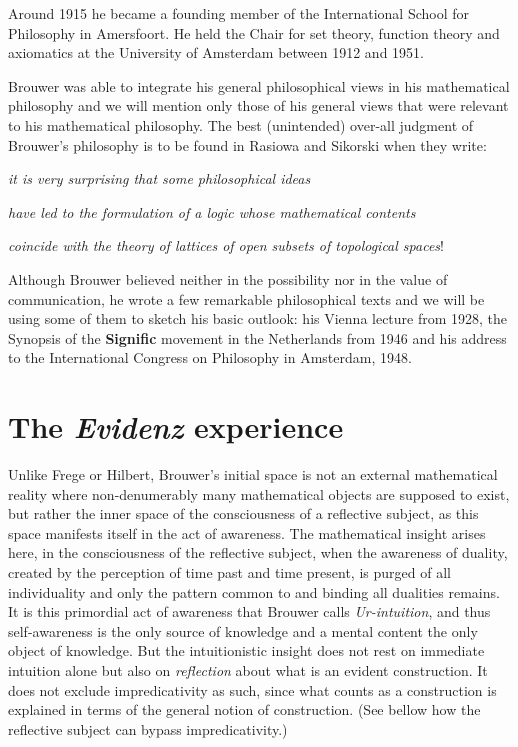 \documentclass[12pt]{article}
\begin{document}
Around 1915 he became a founding member of the International School for Philosophy in Amersfoort. He held the Chair for set theory, function theory and axiomatics at the University of Amsterdam between 1912 and 1951.

Brouwer was able to integrate his general philosophical views in his mathematical philosophy and we will mention only those of his general views that were relevant to his mathematical philosophy. The best (unintended) over-all judgment of Brouwer's philosophy is to be found in Rasiowa and Sikorski when they write:

\begin{center}
\emph{it is very surprising that some philosophical ideas}

\emph{have led to the formulation of a logic whose mathematical contents} 

\emph{coincide with the theory of lattices of open subsets of topological spaces}!
\end{center}

Although Brouwer believed  neither in the possibility nor in the value of communication, he wrote a few remarkable philosophical texts and we will be using some of them to sketch his basic outlook: his Vienna lecture from 1928, the Synopsis of the \textbf{Signific} movement in the Netherlands from 1946 and his address to the International Congress on Philosophy in Amsterdam, 1948.

\section{The \emph{Evidenz} experience}\normalsize

Unlike Frege or Hilbert, Brouwer's initial space is not an external mathematical reality where non-denumerably many mathematical objects are supposed to exist, but rather the inner space of the consciousness of a reflective subject, as this space manifests itself in the act of awareness. The mathematical insight arises here, in the consciousness of the reflective subject, when the awareness of duality, created by the perception of time past and time present, is purged of all individuality and only the pattern common to and binding all dualities remains. It is this primordial act of awareness that Brouwer calls \emph{Ur-intuition}, and thus self-awareness is the only source of knowledge and a mental content the only object of knowledge. But the intuitionistic insight does not rest on immediate intuition alone but also on \emph{reflection} about what is an evident construction. It does not exclude impredicativity as such, since what counts as a construction is explained in terms of the general notion of construction. (See bellow how the reflective subject can bypass impredicativity.)
\end{document}
